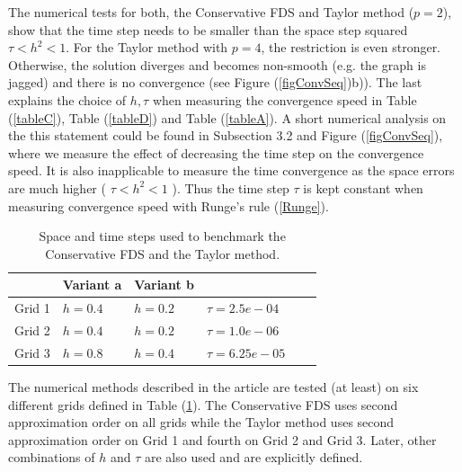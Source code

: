 \documentclass[%
 aip,
cp,  
 amsmath,amssymb,
 reprint,
]{iopconfser}
\newcommand{\rf}[1]{(\ref{#1})}
\begin{document}
The numerical tests for both, the Conservative FDS and Taylor method ($p=2$), show that the time step needs to be smaller than the space step squared $\tau < h^2 < 1$. For the Taylor method with $p=4$, the restriction is even stronger. Otherwise, the solution diverges and becomes non-smooth (e.g. the graph is jagged) and there is no convergence (see Figure \rf{figConvSeq}b)). The last explains the choice of $h, \tau$ when measuring the convergence speed in Table \rf{tableC}, Table \rf{tableD} and Table \rf{tableA}. A short numerical analysis on the this statement could be found in Subsection 3.2 and Figure \rf{figConvSeq}, where we measure the effect of decreasing the time step on the convergence speed. It is also inapplicable to measure the time convergence as the space errors are much higher ( $\tau < h^2 < 1$ ). Thus the time step $\tau$ is kept constant when measuring convergence speed with Runge's rule \rf{Runge}.

\begin{table}[ht]
\centering
\small
		\begin{tabular}{|c|l|l|l|l|l|}
			\hline
                               &           Variant a  &           Variant b     &     \\
			\hline
            Grid 1          &            $h=0.4$  &            $h=0.2$     &    $\tau = 2.5e-04$  \\
			\hline
           Grid 2         &            $h=0.4$  &   $h=0.2$  &    $\tau =1.0e-06$   \\   
   			\hline 
           Grid 3         &            $h=0.8$  &            $h=0.4$  &    $\tau =6.25e-05$   \\    
	   \hline
		\end{tabular}
	\caption{ Space and time steps used to benchmark the Conservative FDS and the Taylor method.}
	\label{gridsT}
\end{table}

The numerical methods described in the article are tested (at least) on six different grids defined in Table \rf{gridsT}. The Conservative FDS uses second approximation order on all grids while the Taylor method uses second approximation order on Grid 1 and fourth on Grid 2 and Grid 3. Later, other combinations of $h$ and $\tau$ are also used and are explicitly defined.
\end{document}
